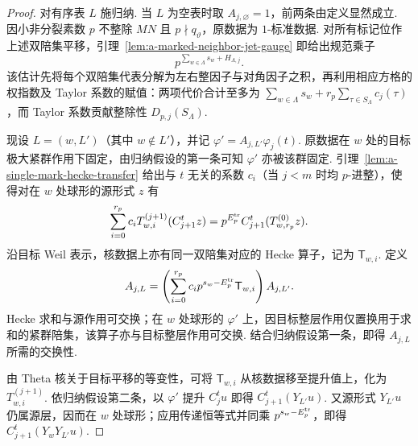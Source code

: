 \begin{proof}
对有序表 $L$ 施归纳. 当 $L$ 为空表时取 $A_{j,\varnothing}=1$，前两条由定义显然成立. 因小非分裂素数 $p$ 不整除 $MN$ 且 $p\nmid q_\vartheta$，原数据为 $1$-标准数据. 对所有标记位作上述双陪集平移，引理~\ref{lem:a-marked-neighbor-jet-gauge} 即给出规范乘子
\[
 p^{\sum_{w\in\Lambda}s_w+H_{\Lambda,j}} .
\]
该估计先将每个双陪集代表分解为左右整因子与对角因子之积，再利用相应方格的权指数及 Taylor 系数的赋值：两项代价合计至多为
$\sum_{w\in\Lambda}s_w+r_p\sum_{\tau\in S_\Lambda}c_j(\tau)$，而 Taylor 系数贡献整除性 $D_{p,j}(S_\Lambda)$.

现设 $L=(w,L')$（其中 $w\notin L'$），并记 $\varphi'=A_{j,L'}\varphi_j(t)$. 原数据在 $w$ 处的目标极大紧群作用下固定，由归纳假设的第一条可知 $\varphi'$ 亦被该群固定. 引理~\ref{lem:a-single-mark-hecke-transfer} 给出与 $t$ 无关的系数 $c_i$（当 $j<m$ 时均 $p$-进整），使得对在 $w$ 处球形的源形式 $z$ 有
\[
 \sum_{i=0}^{r_p}c_iT_{w,i}^{(j+1)}(C_{j+1}^t z)
   =p^{E_p^{\rm tr}}C_{j+1}^t(T_{w,r_p}^{(0)}z).
\]
沿目标 Weil 表示，核数据上亦有同一双陪集对应的 Hecke 算子，记为 $\mathsf T_{w,i}$. 定义
\[
 A_{j,L}
   =\left(\sum_{i=0}^{r_p}
       c_i p^{s_w-E_p^{\rm tr}}\mathsf T_{w,i}\right) A_{j,L'} .
\]
Hecke 求和与源作用可交换；在 $w$ 处球形的 $\varphi'$ 上，因目标整层作用仅置换用于求和的紧群陪集，该算子亦与目标整层作用可交换. 结合归纳假设第一条，即得 $A_{j,L}$ 所需的交换性.

由 Theta 核关于目标平移的等变性，可将 $\mathsf T_{w,i}$ 从核数据移至提升值上，化为 $T_{w,i}^{(j+1)}$. 依归纳假设第二条，以 $\varphi'$ 提升 $C_j^tu$ 即得 $C_{j+1}^t(Y_{L'}u)$. 又源形式 $Y_{L'}u$ 仍属源层，因而在 $w$ 处球形；应用传递恒等式并同乘 $p^{s_w-E_p^{\rm tr}}$，即得 $C_{j+1}^t(Y_wY_{L'}u)$.


\end{proof}
